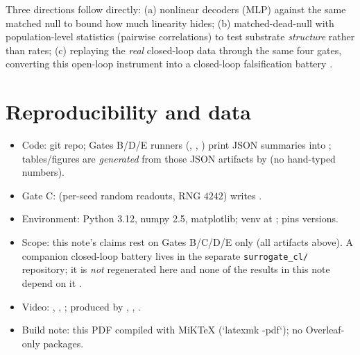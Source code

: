 \documentclass[10pt,a4paper]{article}
\begin{document}
Three directions follow directly: (a) nonlinear decoders (MLP) against
the same matched null to bound how much linearity hides;
(b) matched-dead-null with population-level statistics (pairwise
correlations) to test substrate \emph{structure} rather than rates;
(c) replaying the \emph{real} closed-loop data through the same four
gates, converting this open-loop instrument into a closed-loop
falsification battery \cite{carmena2003,embodied_neurocomp}.

\section{Reproducibility and data}\label{sec:repro}
\begin{itemize}[nosep]
\item Code:  git repo; Gates B/D/E runners
(, , )
print JSON summaries into ; tables/figures are
\emph{generated} from those JSON artifacts by
 (no hand-typed numbers).
\item Gate C:  (per-seed random readouts,
RNG $4242$) writes .
\item Environment: Python \SI{3.12}{}, numpy \SI{2.5}{},
matplotlib; venv at ; 
pins versions.
\item Scope: this note's claims rest on Gates B/C/D/E only (all
artifacts above). A companion closed-loop battery lives in the separate
\texttt{surrogate\_cl/} repository; it is \emph{not} regenerated here
and none of the results in this note depend on it \cite{embodied_neurocomp}.
\item Video: , ,
; produced by ,
, .
\item Build note: this PDF compiled with MiKTeX (`latexmk -pdf`); no
Overleaf-only packages.
\end{itemize}
\end{document}
